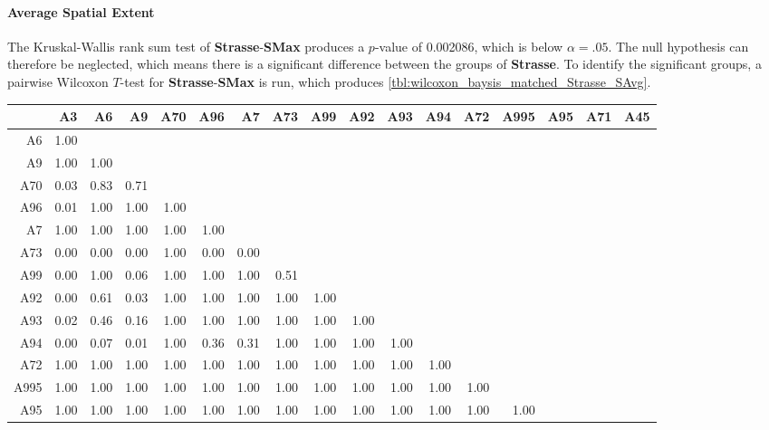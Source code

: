 \paragraph{Average Spatial Extent}
The Kruskal-Wallis rank sum test of \textbf{Strasse}-\textbf{SMax} produces a $p$-value of 0.002086, which is below $\alpha=.05$. The null hypothesis can therefore be neglected, which means there is a significant difference between the groups of \textbf{Strasse}. To identify the significant groups, a pairwise Wilcoxon $T$-test for \textbf{Strasse}-\textbf{SMax} is run, which produces \autoref{tbl:wilcoxon_baysis_matched_Strasse_SAvg}.
\begin{table}[ht]
	\tiny
	\setlength{\tabcolsep}{4pt}
	\centering
	\begin{tabular}{rrrrrrrrrrrrrrrrr}
		\toprule
	 	& A3 & A6 & A9 & A70 & A96 & A7 & A73 & A99 & A92 & A93 & A94 & A72 & A995 & A95 & A71 & A45 \\ 
		\midrule
		A6 & 1.00 &  &  &  &  &  &  &  &  &  &  &  &  &  &  &  \\ 
	  	A9 & 1.00 & 1.00 &  &  &  &  &  &  &  &  &  &  &  &  &  &  \\ 
	  	A70 & 0.03 & 0.83 & 0.71 &  &  &  &  &  &  &  &  &  &  &  &  &  \\ 
	  	A96 & 0.01 & 1.00 & 1.00 & 1.00 &  &  &  &  &  &  &  &  &  &  &  &  \\ 
	  	A7 & 1.00 & 1.00 & 1.00 & 1.00 & 1.00 &  &  &  &  &  &  &  &  &  &  &  \\ 
	  	A73 & 0.00 & 0.00 & 0.00 & 1.00 & 0.00 & 0.00 &  &  &  &  &  &  &  &  &  &  \\ 
	  	A99 & 0.00 & 1.00 & 0.06 & 1.00 & 1.00 & 1.00 & 0.51 &  &  &  &  &  &  &  &  &  \\ 
	  	A92 & 0.00 & 0.61 & 0.03 & 1.00 & 1.00 & 1.00 & 1.00 & 1.00 &  &  &  &  &  &  &  &  \\ 
	  	A93 & 0.02 & 0.46 & 0.16 & 1.00 & 1.00 & 1.00 & 1.00 & 1.00 & 1.00 &  &  &  &  &  &  &  \\ 
	  	A94 & 0.00 & 0.07 & 0.01 & 1.00 & 0.36 & 0.31 & 1.00 & 1.00 & 1.00 & 1.00 &  &  &  &  &  &  \\ 
	  	A72 & 1.00 & 1.00 & 1.00 & 1.00 & 1.00 & 1.00 & 1.00 & 1.00 & 1.00 & 1.00 & 1.00 &  &  &  &  &  \\ 
	  	A995 & 1.00 & 1.00 & 1.00 & 1.00 & 1.00 & 1.00 & 1.00 & 1.00 & 1.00 & 1.00 & 1.00 & 1.00 &  &  &  &  \\ 
	  	A95 & 1.00 & 1.00 & 1.00 & 1.00 & 1.00 & 1.00 & 1.00 & 1.00 & 1.00 & 1.00 & 1.00 & 1.00 & 1.00 &  &  &  \\ 

\end{tabular}
\end{table}

